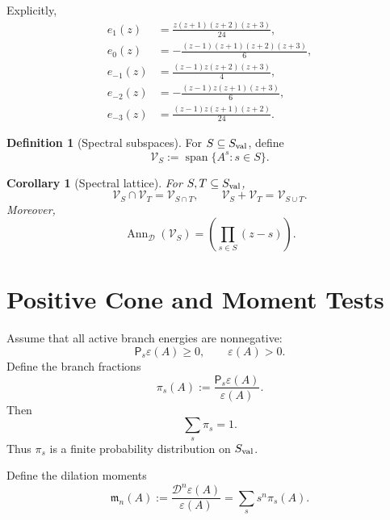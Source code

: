 \documentclass[aps,prd,preprint,onecolumn,nofootinbib,superscriptaddress,showkeys]{revtex4-2}
\numberwithin{equation}{section}
\theoremstyle{definition}
\newtheorem{definition}{Definition}[section]
\theoremstyle{plain}
\newtheorem{corollary}{Corollary}[section]
\newcommand{\Dil}{\mathscr D}
\newcommand{\Ann}{\operatorname{Ann}}
\newcommand{\spanop}{\operatorname{span}}
\begin{document}
Explicitly,
\begin{align}
e_1(z)&=\frac{z(z+1)(z+2)(z+3)}{24},\\
e_0(z)&=-\frac{(z-1)(z+1)(z+2)(z+3)}{6},\\
e_{-1}(z)&=\frac{(z-1)z(z+2)(z+3)}{4},\\
e_{-2}(z)&=-\frac{(z-1)z(z+1)(z+3)}{6},\\
e_{-3}(z)&=\frac{(z-1)z(z+1)(z+2)}{24}.
\end{align}

\begin{definition}[Spectral subspaces]
For \(S\subseteq S_{\rm val}\), define
\begin{equation}
\mathcal V_S:=\spanop\{A^s:s\in S\}.
\end{equation}
\end{definition}

\begin{corollary}[Spectral lattice]
For \(S,T\subseteq S_{\rm val}\),
\begin{equation}
\mathcal V_S\cap\mathcal V_T=\mathcal V_{S\cap T},
\qquad
\mathcal V_S+\mathcal V_T=\mathcal V_{S\cup T}.
\end{equation}
Moreover,
\begin{equation}
\Ann_{\Dil}(\mathcal V_S)
=
\left(
\prod_{s\in S}(z-s)
\right).
\end{equation}
\end{corollary}

\section{Positive Cone and Moment Tests}

Assume that all active branch energies are nonnegative:
\begin{equation}
\mathsf P_s\varepsilon(A)\ge0,
\qquad
\varepsilon(A)>0.
\end{equation}
Define the branch fractions
\begin{equation}
\pi_s(A):=\frac{\mathsf P_s\varepsilon(A)}{\varepsilon(A)}.
\end{equation}
Then
\begin{equation}
\sum_s\pi_s=1.
\end{equation}
Thus \(\pi_s\) is a finite probability distribution on \(S_{\rm val}\).

Define the dilation moments
\begin{equation}
\mathfrak m_n(A):=
\frac{\Dil^n\varepsilon(A)}{\varepsilon(A)}
=
\sum_s s^n\pi_s(A).
\end{equation}
\end{document}
